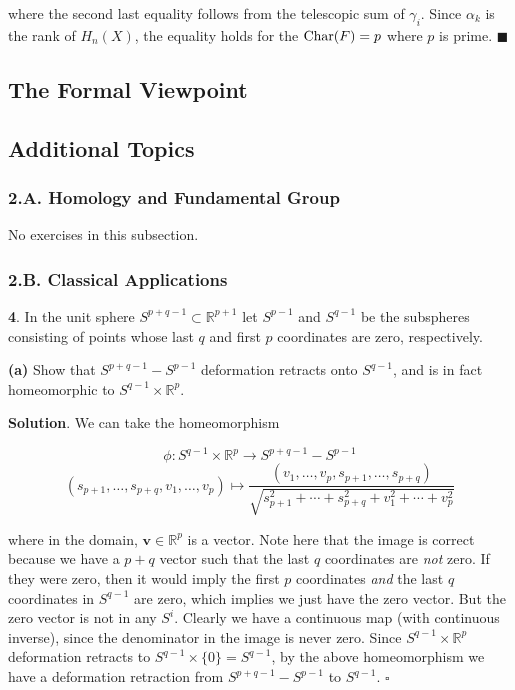 \documentclass{article}
\newcommand{\R}{\mathbb{R}}
\newcommand{\Char}{\textnormal{Char}}
\begin{document}
where the second last equality follows from the telescopic sum of $\gamma_{i}$. Since $\alpha_{k}$ is the rank of $H_{n}(X)$, the equality holds for the $\Char (F) = p$ where $p$ is prime. $\blacksquare$
\bigskip
\bigskip

\subsection{The Formal Viewpoint}

\subsection*{Additional Topics}

\subsubsection*{2.A. Homology and Fundamental Group}

\tab No exercises in this subsection.
\bigskip
\bigskip

\subsubsection*{2.B. Classical Applications}

\tab \textbf{4}. In the unit sphere $S^{p+q-1}\subset \R^{p+1}$ let $S^{p-1}$ and $S^{q-1}$ be the subspheres consisting of points whose last $q$ and first $p$ coordinates are zero, respectively.
\medskip

\textbf{(a)} Show that $S^{p+q-1} - S^{p-1}$ deformation retracts onto $S^{q-1}$, and is in fact homeomorphic to $S^{q-1}\times \R^{p}$.
\medskip

\textbf{Solution}. We can take the homeomorphism

$$\phi: S^{q-1}\times \R^{p}\to S^{p+q-1}-S^{p-1}$$
$$(s_{p+1},\ldots, s_{p+q}, v_{1},\ldots, v_{p})\mapsto \frac{(v_{1},\ldots, v_{p}, s_{p+1},\ldots, s_{p+q})}{\sqrt{s_{p+1}^{2}+\cdots + s_{p+q}^{2} + v_{1}^{2} + \cdots + v_{p}^{2}}}$$

where in the domain, $\mathbf{v}\in \R^{p}$ is a vector. Note here that the image is correct because we have a $p + q$ vector such that the last $q$ coordinates are \textit{not} zero. If they were zero, then it would imply the first $p$ coordinates \textit{and} the last $q$ coordinates in $S^{q-1}$ are zero, which implies we just have the zero vector. But the zero vector is not in any $S^{i}$. Clearly we have a continuous map (with continuous inverse), since the denominator in the image is never zero. Since $S^{q-1}\times \R^{p}$ deformation retracts to $S^{q-1}\times \{0\} = S^{q-1}$, by the above homeomorphism we have a deformation retraction from $S^{p+q-1}-S^{p-1}$ to $S^{q-1}$. $\square$
\medskip
\end{document}
